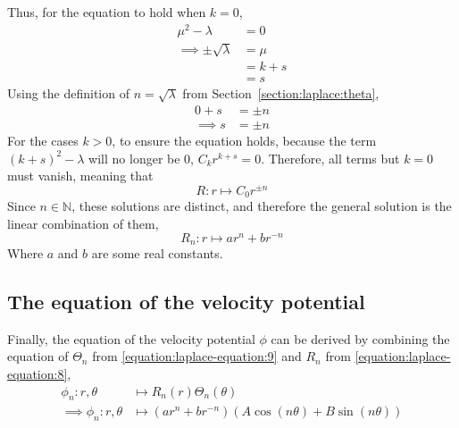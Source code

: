 Thus, for the equation to hold when $k=0$,
\begin{align*}
    \mu^2-\lambda&=0\\
    \implies\pm\sqrt{\lambda}&=\mu\\
    &=k+s\\
    &=s
\end{align*}
Using the definition of $n=\sqrt{\lambda}$ from Section~\ref{section:laplace:theta},
\begin{align*}
    0+s&=\pm n\\
    \implies s&=\pm n
\end{align*}
For the cases $k>0$, to ensure the equation holds, because the term $(k+s)^2-\lambda$ will no longer be $0$, $C_k r^{k+s}=0$. Therefore, all terms but $k=0$ must vanish, meaning that
$$
    R:r\mapsto C_0r^{\pm n}
$$
Since $n\in\mathbb{N}$, these solutions are distinct, and therefore the general solution is the linear combination of them,
\begin{equation}\label{equation:laplace-equation:8}
    R_n:r\mapsto ar^n+br^{-n}
\end{equation}
Where $a$ and $b$ are some real constants.

\subsection{The equation of the velocity potential}
Finally, the equation of the velocity potential $\phi$ can be derived by combining the equation of $\Theta_n$ from \eqref{equation:laplace-equation:9}
and $R_n$ from \eqref{equation:laplace-equation:8},
\begin{align*}
    \phi_n:r,\theta&\mapsto R_n(r)\Theta_n(\theta)\\
    \implies\phi_n:r,\theta&\mapsto\left(ar^n+br^{-n}\right)\left(A\cos\left(n\theta\right)+B\sin\left(n\theta\right)\right)
\end{align*}